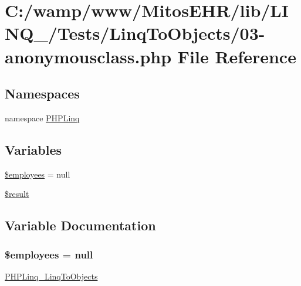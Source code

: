 \hypertarget{_linq_to_objects_203-anonymousclass_8php}{\section{\-C\-:/wamp/www/\-Mitos\-E\-H\-R/lib/\-L\-I\-N\-Q\-\_/\-Tests/\-Linq\-To\-Objects/03-\/anonymousclass.php \-File \-Reference}
\label{_linq_to_objects_203-anonymousclass_8php}
}
\subsection*{\-Namespaces}
\begin{DoxyCompactItemize}
\item 
namespace \hyperlink{namespace_p_h_p_linq}{\-P\-H\-P\-Linq}
\end{DoxyCompactItemize}
\subsection*{\-Variables}
\begin{DoxyCompactItemize}
\item 
\hyperlink{_linq_to_objects_203-anonymousclass_8php_a598c06abe9d65a9d2990e39693ce2c27}{\$employees} = null
\item 
\hyperlink{_linq_to_objects_203-anonymousclass_8php_a112ef069ddc0454086e3d1e6d8d55d07}{\$result}
\end{DoxyCompactItemize}


\subsection{\-Variable \-Documentation}
\hypertarget{_linq_to_objects_203-anonymousclass_8php_a598c06abe9d65a9d2990e39693ce2c27}{
\subsubsection[{\$employees}]{\setlength{\rightskip}{0pt plus 5cm}\$employees = null}}\label{_linq_to_objects_203-anonymousclass_8php_a598c06abe9d65a9d2990e39693ce2c27}
\hyperlink{class_p_h_p_linq___linq_to_objects}{\-P\-H\-P\-Linq\-\_\-\-Linq\-To\-Objects} 

